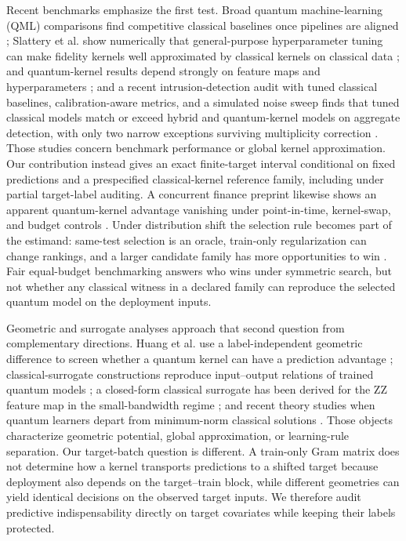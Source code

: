 \documentclass[referee,lineno,pdflatex,sn-vancouver-num]{sn-jnl}
\theoremstyle{thmstyleone}%
\theoremstyle{thmstyletwo}%
\theoremstyle{thmstylethree}%
\begin{document}
Recent benchmarks emphasize the first test. Broad quantum machine-learning (QML) comparisons find competitive classical baselines once pipelines are aligned \cite{bowles2024betterthanclassical}; Slattery et al. show numerically that general-purpose hyperparameter tuning can make fidelity kernels well approximated by classical kernels on classical data \cite{slattery2023numerical}; and quantum-kernel results depend strongly on feature maps and hyperparameters \cite{schnabel2025scrutiny}; and a recent intrusion-detection audit with tuned classical baselines, calibration-aware metrics, and a simulated noise sweep finds that tuned classical models match or exceed hybrid and quantum-kernel models on aggregate detection, with only two narrow exceptions surviving multiplicity correction \cite{gillani2026howquantum}. Those studies concern benchmark performance or global kernel approximation. Our contribution instead gives an exact finite-target interval conditional on fixed predictions and a prespecified classical-kernel reference family, including under partial target-label auditing. A concurrent finance preprint likewise shows an apparent quantum-kernel advantage vanishing under point-in-time, kernel-swap, and budget controls \cite{shen2026vanishing}. Under distribution shift the selection rule becomes part of the estimand: same-test selection is an oracle, train-only regularization can change rankings, and a larger candidate family has more opportunities to win \cite{gulrajani2021domainbed,koh2021wilds,yao2022wildtime,zhou2023dgsurvey}. Fair equal-budget benchmarking answers who wins under symmetric search, but not whether any classical witness in a declared family can reproduce the selected quantum model on the deployment inputs.

Geometric and surrogate analyses approach that second question from complementary directions. Huang et al. use a label-independent geometric difference to screen whether a quantum kernel can have a prediction advantage \cite{huang2021powerofdata}; classical-surrogate constructions reproduce input--output relations of trained quantum models \cite{schreiber2023surrogates}; a closed-form classical surrogate has been derived for the ZZ feature map in the small-bandwidth regime \cite{tekeli2026zzsurrogate}; and recent theory studies when quantum learners depart from minimum-norm classical solutions \cite{thabet2026disagree}. Those objects characterize geometric potential, global approximation, or learning-rule separation. Our target-batch question is different. A train-only Gram matrix does not determine how a kernel transports predictions to a shifted target because deployment also depends on the target--train block, while different geometries can yield identical decisions on the observed target inputs. We therefore audit predictive indispensability directly on target covariates while keeping their labels protected.
\end{document}
